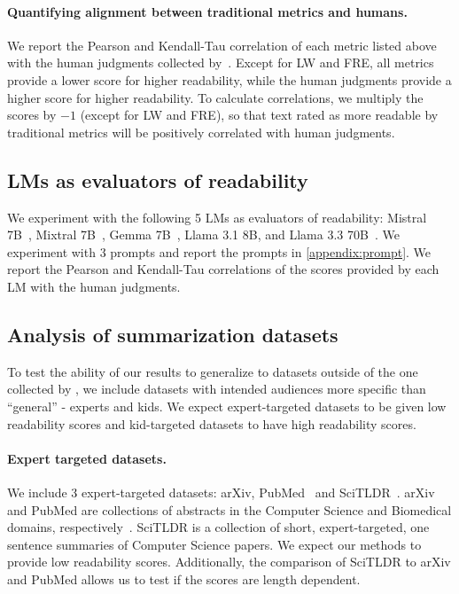 \paragraph{Quantifying alignment between traditional metrics and humans.} We report the Pearson and Kendall-Tau correlation of each metric listed above with the human judgments collected by~\textcite{August2024KnowYA}.
Except for LW and FRE, all metrics provide a lower score for higher readability, while the human judgments provide a higher score for higher readability. To calculate correlations, we multiply the scores by $-1$ (except for LW and FRE), so that text rated as more readable by traditional metrics will be positively correlated with human judgments.

\subsection[LMs as evaluators of readability]{LMs as evaluators of readability \hyperref[rq3]{\rqthree}}\label{sec:rq-three-setup}

We experiment with the following 5 LMs as evaluators of readability: Mistral 7B~\cite{jiang2023mistral7b}, Mixtral 7B~\cite{Jiang2024MixtralOE}, Gemma 7B~\cite{gemma_2024}, Llama 3.1 8B, and Llama 3.3 70B~\cite{grattafiori2024llama3}. We experiment with 3 prompts and report the prompts in \cref{appendix:prompt}. We report the Pearson and Kendall-Tau correlations of the scores provided by each LM with the human judgments.


\subsection[Analysis of summarization datasets]{Analysis of summarization datasets \hyperref[rq4]{\rqfour}}
To test the ability of our results to generalize to datasets outside of the one collected by \textcite{August2024KnowYA}, we include datasets with intended audiences more specific than ``general'' - experts and kids. We expect expert-targeted datasets to be given low readability scores and kid-targeted datasets to have high readability scores.

\paragraph{Expert targeted datasets.} We include 3 expert-targeted datasets: arXiv, PubMed~\cite{cohan2018discourse} and SciTLDR~\cite{cachola2020tldr}.
arXiv and PubMed are collections of abstracts in the Computer Science and Biomedical domains, respectively~\cite{cohan2018discourse}. SciTLDR is a collection of short, expert-targeted, one sentence summaries of Computer Science papers. We expect our methods to provide low readability scores. Additionally, the comparison of SciTLDR to arXiv and PubMed allows us to test if the scores are length dependent. 


